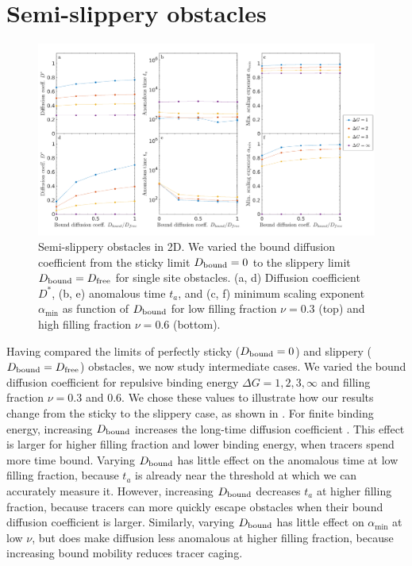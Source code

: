 \section{Semi-slippery obstacles}
\begin{figure}[!hb]
  \begin{center}
	  \includegraphics[width=150mm]{figs/ch02_soft/soft_semi_slippery.png}
  \end{center}
	\caption[Semi-slippery obstacles]
    {Semi-slippery obstacles in 2D.  We varied the bound diffusion
    coefficient from the sticky limit $D_{\rm bound}=0$ to the slippery
    limit $D_{\rm bound}=D_{\rm free}$ for single site obstacles.  
    (a, d) Diffusion coefficient $D^*$, (b, e) anomalous time $ t_a $, 
    and (c, f) minimum scaling exponent $\alpha_{\min}$  as function of 
    $D_{\rm bound}$ for  low filling fraction $\nu=0.3$ (top) and high 
    filling fraction $\nu =0.6$ (bottom).}\label{fig:semi_slippery}
\end{figure}

Having compared the limits of perfectly sticky ($D_{\rm bound} = 0$) and
slippery ($D_{\rm bound} = D_{\rm free}$) obstacles, we now study intermediate
cases.  We varied the bound diffusion coefficient for repulsive binding energy
$\Delta G = 1, 2, 3, \infty$ and filling fraction $ \nu = 0.3 $ and $ 0.6 $. We
chose these values to illustrate how our results change from the sticky to the
slippery case, as shown in .  For finite binding energy,
increasing $D_{\rm bound}$ increases the long-time diffusion coefficient
. This effect is larger for higher filling fraction
and lower binding energy, when tracers spend more time bound.  Varying $D_{\rm
  bound}$ has little effect on the anomalous time at low filling fraction,
because $t_{a}$ is already near the threshold at which we can accurately measure
it. However, increasing $D_{\rm bound}$ decreases $t_{a}$ at higher filling
fraction, because tracers can more quickly escape obstacles when their bound
diffusion coefficient is larger. Similarly, varying $ D_{\rm bound} $ has little
effect on $\alpha_{\min}$ at low $\nu$, but does make diffusion less anomalous
at higher filling fraction, because increasing bound mobility reduces tracer
caging.

